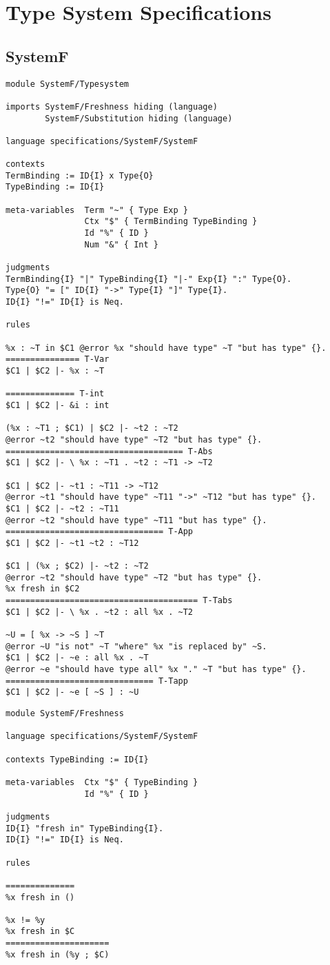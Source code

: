 \chapter{Type System Specifications}
\section{SystemF}
\label{appendix:systemf}
\begin{lstlisting}[language=sltc]
module SystemF/Typesystem

imports SystemF/Freshness hiding (language)
        SystemF/Substitution hiding (language)

language specifications/SystemF/SystemF

contexts
TermBinding := ID{I} x Type{O}
TypeBinding := ID{I}

meta-variables  Term "~" { Type Exp }
                Ctx "$" { TermBinding TypeBinding }
                Id "%" { ID }
                Num "&" { Int }

judgments
TermBinding{I} "|" TypeBinding{I} "|-" Exp{I} ":" Type{O}.
Type{O} "= [" ID{I} "->" Type{I} "]" Type{I}.
ID{I} "!=" ID{I} is Neq.

rules

%x : ~T in $C1 @error %x "should have type" ~T "but has type" {}.
=============== T-Var
$C1 | $C2 |- %x : ~T

============== T-int
$C1 | $C2 |- &i : int

(%x : ~T1 ; $C1) | $C2 |- ~t2 : ~T2
@error ~t2 "should have type" ~T2 "but has type" {}.
==================================== T-Abs
$C1 | $C2 |- \ %x : ~T1 . ~t2 : ~T1 -> ~T2

$C1 | $C2 |- ~t1 : ~T11 -> ~T12
@error ~t1 "should have type" ~T11 "->" ~T12 "but has type" {}.
$C1 | $C2 |- ~t2 : ~T11
@error ~t2 "should have type" ~T11 "but has type" {}.
================================ T-App
$C1 | $C2 |- ~t1 ~t2 : ~T12

$C1 | (%x ; $C2) |- ~t2 : ~T2
@error ~t2 "should have type" ~T2 "but has type" {}.
%x fresh in $C2
======================================= T-Tabs
$C1 | $C2 |- \ %x . ~t2 : all %x . ~T2

~U = [ %x -> ~S ] ~T 
@error ~U "is not" ~T "where" %x "is replaced by" ~S.
$C1 | $C2 |- ~e : all %x . ~T
@error ~e "should have type all" %x "." ~T "but has type" {}.
============================== T-Tapp
$C1 | $C2 |- ~e [ ~S ] : ~U
\end{lstlisting}
\newpage
\begin{lstlisting}[language=sltc]
module SystemF/Freshness

language specifications/SystemF/SystemF

contexts TypeBinding := ID{I}

meta-variables  Ctx "$" { TypeBinding }
                Id "%" { ID }

judgments 
ID{I} "fresh in" TypeBinding{I}.
ID{I} "!=" ID{I} is Neq.

rules

==============
%x fresh in ()

%x != %y
%x fresh in $C
=====================
%x fresh in (%y ; $C)
\end{lstlisting}
